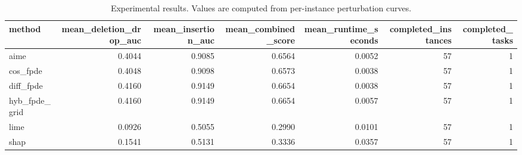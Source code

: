 \begin{table}[t]
\caption{Experimental results. Values are computed from per-instance perturbation curves.}
\label{tab:main_results_computed}
\centering
\begin{tabular}{lrrrrrr}
\toprule
method & mean\_deletion\_drop\_auc & mean\_insertion\_auc & mean\_combined\_score & mean\_runtime\_seconds & completed\_instances & completed\_tasks \\
\midrule
aime & 0.4044 & 0.9085 & 0.6564 & 0.0052 & 57 & 1 \\
cos\_fpde & 0.4048 & 0.9098 & 0.6573 & 0.0038 & 57 & 1 \\
diff\_fpde & 0.4160 & 0.9149 & 0.6654 & 0.0038 & 57 & 1 \\
hyb\_fpde\_grid & 0.4160 & 0.9149 & 0.6654 & 0.0057 & 57 & 1 \\
lime & 0.0926 & 0.5055 & 0.2990 & 0.0101 & 57 & 1 \\
shap & 0.1541 & 0.5131 & 0.3336 & 0.0357 & 57 & 1 \\
\bottomrule
\end{tabular}

\end{table}
